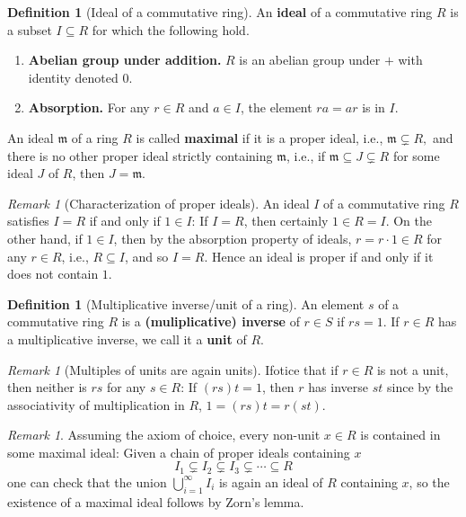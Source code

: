\documentclass[12pt]{amsart}
\theoremstyle{definition}
\newtheorem{definition}[theorem]{Definition}
\theoremstyle{remark}
\newtheorem{remark}[theorem]{Remark}
\begin{document}
\begin{definition}[Ideal of a commutative ring]
An \textbf{ideal} of a commutative ring $R$ is a subset $I \subseteq R$ for which the following hold. 
\begin{enumerate}[topsep=0cm,itemsep=0cm]
\item \textbf{Abelian group under addition.}  $R$ is an abelian group under $+$ with identity denoted $0$.
\item \textbf{Absorption.} For any $r \in R$ and $a \in I$, the element $r a = a r$ is in $I$. 
\end{enumerate}
An ideal $\mathfrak{m}$ of a ring $R$ is called \textbf{maximal} if it is  a proper ideal, i.e., $\mathfrak{m} \subsetneq R,$ and there is no other proper ideal strictly containing $\mathfrak{m}$, i.e., if $\mathfrak{m} \subseteq J \subsetneq R$ for some ideal $J$ of $R$, then $J = \mathfrak{m}$. 
\end{definition}






\begin{remark}[Characterization of proper ideals] \label{proper-ideal: R}
An ideal $I$ of a commutative ring $R$ satisfies $I = R$ if and only if $1 \in I$:  
If $I=R$, then certainly $1 \in R = I$.  On the other hand, if $1 \in I$, then by the absorption property of ideals, $r = r \cdot 1 \in R$ for any $r \in R$, i.e., $R \subseteq I$, and so $I = R.$  Hence an ideal is proper if and only if it does not contain $1$. 
\end{remark}



\begin{definition}[Multiplicative inverse/unit of a ring] 
An element $s$ of a commutative ring $R$ is a \textbf{(muliplicative) inverse}  of $r \in S$ if $rs = 1$.
If $r\in R$ has a multiplicative inverse, we call it a \textbf{unit} of $R$. 
\end{definition}

\begin{remark}[Multiples of units are again units] \label{multiples-units: R}
Ifotice that if $r \in R$ is not a unit, then neither is $rs$ for any $s \in R$:   If $(rs)t = 1$, then $r$ has inverse $st$ since by the associativity of multiplication in $R$,  $1 = (rs)t = r(st)$. 
\end{remark}



\begin{remark} \label{maximal-ideals-existence: R}
Assuming the axiom of choice, every non-unit $x \in R$ is contained in some maximal ideal:
Given a chain of proper ideals containing $x$
\[
I_1 \subsetneq I_2 \subsetneq I_3 \subsetneq \cdots  \subseteq R
\]
one can check that the union $\bigcup_{i=1}^\infty I_i$ is again an ideal of $R$ containing $x$, so the existence of a maximal ideal follows by Zorn's lemma.  
\end{remark}
\end{document}
